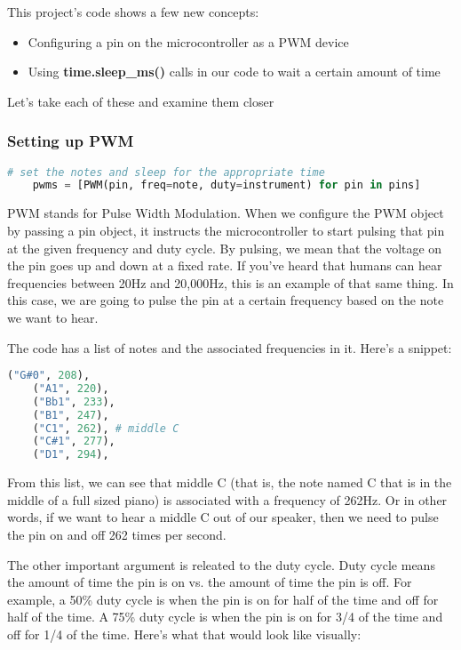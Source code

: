 This project's code shows a few new concepts:
\begin{itemize}
    \item Configuring a pin on the microcontroller as a PWM device
    \item Using \textbf{time.sleep\_ms()} calls in our code to wait a certain amount of time
\end{itemize}

Let's take each of these and examine them closer

\subsubsection{Setting up PWM}
\begin{lstlisting}[language=Python,caption=PWM Mode]
    # set the notes and sleep for the appropriate time
    pwms = [PWM(pin, freq=note, duty=instrument) for pin in pins]
\end{lstlisting}

PWM stands for Pulse Width Modulation. When we configure the PWM object by passing
a pin object, it instructs the microcontroller to start pulsing that pin at the given
frequency and duty cycle. By pulsing, we mean that the voltage on the pin goes up and
down at a fixed rate. If you've heard that humans can hear frequencies between 20Hz and 20,000Hz,
this is an example of that same thing. In this case, we are going to pulse the pin at
a certain frequency based on the note we want to hear.

The code has a list of notes and the associated frequencies in it. Here's a snippet:

\begin{lstlisting}[language=Python,caption=Note names mapped to frequencies]
    ("G#0", 208),
    ("A1", 220),
    ("Bb1", 233),
    ("B1", 247),
    ("C1", 262), # middle C
    ("C#1", 277),
    ("D1", 294),
\end{lstlisting}

From this list, we can see that middle C (that is, the note named C that is in the middle
of a full sized piano) is associated with a frequency of 262Hz. Or in other words, if we
want to hear a middle C out of our speaker, then we need to pulse the pin on and off 262
times per second.

The other important argument is releated to the duty cycle. Duty cycle means the amount
of time the pin is on vs. the amount of time the pin is off. For example, a 50\% duty cycle
is when the pin is on for half of the time and off for half of the time. A 75\% duty cycle
is when the pin is on for 3/4 of the time and off for 1/4 of the time. Here's what that
would look like visually:

